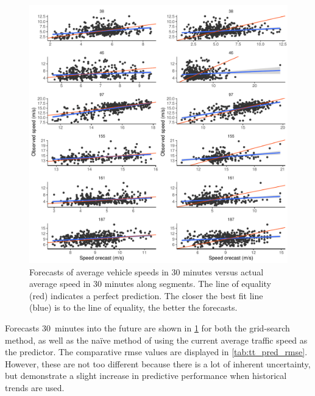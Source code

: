 \begin{knitrout}\small
{}\color{fgcolor}\begin{figure}

{\centering \includegraphics[width=\linewidth]{figure/tt_week1_pred-1} 

}

\caption[Forecasts of average vehicle speeds in 30 minutes versus actual average speed in 30 minutes along segments]{Forecasts of average vehicle speeds in 30 minutes versus actual average speed in 30 minutes along segments. The line of equality (red) indicates a perfect prediction. The closer the best fit line (blue) is to the line of equality, the better the forecasts.}\label{fig:tt_week1_pred}
\end{figure}


\end{knitrout}


Forecasts 30~minutes into the future are shown in \cref{fig:tt_week1_pred} for both the grid-search method, as well as the na\"ive method of using the current average traffic speed as the predictor. The comparative \gls{rmse} values are displayed in \cref{tab:tt_pred_rmse}. However, these are not too different because there is a lot of inherent uncertainty, but demonstrate a slight increase in predictive performance when historical trends are used.


